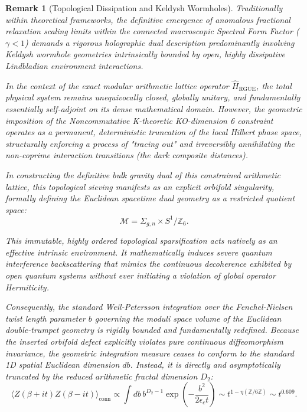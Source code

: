 \documentclass[aps,prl,preprint,superscriptaddress,floatfix]{revtex4-2}
\newtheorem{remark}[theorem]{Remark}
\newcommand{\Zmod}{\mathbb{Z}/6\mathbb{Z}}
\begin{document}
\begin{remark}[Topological Dissipation and Keldysh Wormholes]
\label{rem:keldysh}
Traditionally within theoretical frameworks, the definitive emergence of anomalous fractional relaxation scaling limits within the connected macroscopic Spectral Form Factor ($\gamma < 1$) demands a rigorous holographic dual description predominantly involving Keldysh wormhole geometries intrinsically bounded by open, highly dissipative Lindbladian environment interactions.

In the context of the exact modular arithmetic lattice operator $\hat{H}_{\text{RGUE}}$, the total physical system remains unequivocally closed, globally unitary, and fundamentally essentially self-adjoint on its dense mathematical domain. However, the geometric imposition of the Noncommutative K-theoretic KO-dimension 6 constraint operates as a permanent, deterministic truncation of the local Hilbert phase space, structurally enforcing a process of "tracing out" and irreversibly annihilating the non-coprime interaction transitions (the dark composite distances).

In constructing the definitive bulk gravity dual of this constrained arithmetic lattice, this topological sieving manifests as an explicit orbifold singularity, formally defining the Euclidean spacetime dual geometry as a restricted quotient space:
\begin{equation}
\mathcal{M} = \Sigma_{g,n} \times S^1 / \mathbb{Z}_6.
\end{equation}

This immutable, highly ordered topological sparsification acts natively as an effective intrinsic environment. It mathematically induces severe quantum interference backscattering that mimics the continuous decoherence exhibited by open quantum systems without ever initiating a violation of global operator Hermiticity.

Consequently, the standard Weil-Petersson integration over the Fenchel-Nielsen twist length parameter $b$ governing the moduli space volume of the Euclidean double-trumpet geometry is rigidly bounded and fundamentally redefined. Because the inserted orbifold defect explicitly violates pure continuous diffeomorphism invariance, the geometric integration measure ceases to conform to the standard 1D spatial Euclidean dimension $db$. Instead, it is directly and asymptotically truncated by the reduced arithmetic fractal dimension $D_2$:
\begin{equation}
\langle Z(\beta + it) Z(\beta - it) \rangle_{\text{conn}} \propto \int db \, b^{D_2-1} \exp\left(-\frac{b^2}{2 \epsilon_c t}\right) \sim t^{1 - \eta(\Zmod)} \sim t^{0.609}.
\end{equation}


\end{remark}
\end{document}

